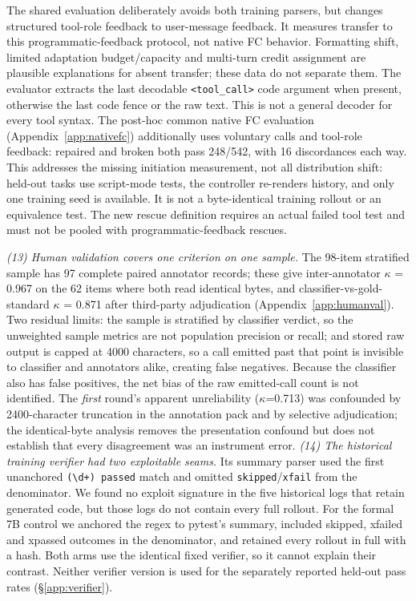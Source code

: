 The shared evaluation deliberately avoids both training parsers, but changes structured tool-role
feedback to user-message feedback. It measures transfer to this programmatic-feedback protocol,
not native FC behavior. Formatting shift, limited adaptation budget/capacity and multi-turn
credit assignment are plausible explanations for absent transfer; these data do not separate them.
The evaluator extracts the last decodable \texttt{<tool\_call>} code argument when present,
otherwise the last code fence or the raw text. This is not a general decoder for every tool syntax.
The post-hoc common native FC evaluation (Appendix~\ref{app:nativefc}) additionally
uses voluntary calls and tool-role feedback: repaired and broken both pass 248/542,
with 16 discordances each way. This addresses the missing initiation measurement,
not all distribution shift: held-out tasks use script-mode tests, the controller
re-renders history, and only one training seed is available. It is not a byte-identical
training rollout or an equivalence test. The new rescue definition requires an actual
failed tool test and must not be pooled with programmatic-feedback rescues.


\emph{(13) Human validation covers one criterion on one sample.} The 98-item stratified sample has 97 complete paired annotator records; these give inter-annotator $\kappa$ = 0.967 on the 62 items where both read identical
bytes, and classifier-vs-gold-standard $\kappa$ = 0.871 after third-party adjudication
(Appendix~\ref{app:humanval}). Two residual limits: the sample is stratified by classifier
verdict, so the unweighted sample metrics are not population precision or recall; and stored raw
output is capped at 4000 characters, so a call emitted past that point is invisible to classifier
and annotators alike, creating false negatives. Because the classifier also has false positives,
the net bias of the raw emitted-call count is not identified. The \emph{first} round's apparent
unreliability ($\kappa$=0.713) was confounded by 2400-character truncation in the annotation
pack and by selective adjudication; the identical-byte analysis removes the presentation confound
but does not establish that every disagreement was an instrument error.
\emph{(14) The historical training verifier had two exploitable seams.} Its summary parser used
the first unanchored \texttt{(\textbackslash d+) passed} match and omitted
\texttt{skipped}/\texttt{xfail} from the denominator. We found no exploit signature in the five
historical logs that retain generated code, but those logs do not contain every full rollout. For
the formal 7B control we anchored the regex to pytest's summary, included skipped, xfailed and
xpassed outcomes in the denominator, and retained every rollout in full with a hash. Both arms use
the identical fixed verifier, so it cannot explain their contrast. Neither verifier version is
used for the separately reported held-out pass rates (\S\ref{app:verifier}).

